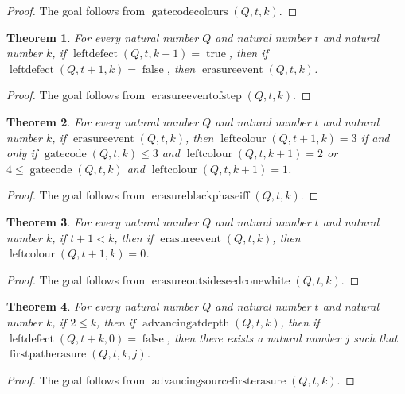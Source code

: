 \documentclass[11pt]{article}
\newtheorem{theorem}{Theorem}[section]
\theoremstyle{definition}
\begin{document}
\begin{proof}
The goal follows from \(\operatorname{gatecodecolours}(Q, t, k)\).
\end{proof}
\begin{theorem}
\label{ll:observations:erasure-event-of-step}
For every natural number \(Q\) and natural number \(t\) and natural number \(k\), if \(\operatorname{leftdefect}(Q, t, k + 1) = \operatorname{true}\), then if \(\operatorname{leftdefect}(Q, t + 1, k) = \operatorname{false}\), then \(\operatorname{erasureevent}(Q, t, k)\).
\end{theorem}
\begin{proof}
The goal follows from \(\operatorname{erasureeventofstep}(Q, t, k)\).
\end{proof}
\begin{theorem}
\label{ll:observations:erasure-black-phase-iff}
For every natural number \(Q\) and natural number \(t\) and natural number \(k\), if \(\operatorname{erasureevent}(Q, t, k)\), then \(\operatorname{leftcolour}(Q, t + 1, k) = 3\) if and only if \(\operatorname{gatecode}(Q, t, k) \le 3\) and \(\operatorname{leftcolour}(Q, t, k + 1) = 2\) or \(4 \le \operatorname{gatecode}(Q, t, k)\) and \(\operatorname{leftcolour}(Q, t, k + 1) = 1\).
\end{theorem}
\begin{proof}
The goal follows from \(\operatorname{erasureblackphaseiff}(Q, t, k)\).
\end{proof}
\begin{theorem}
\label{ll:observations:erasure-outside-seed-cone-white}
For every natural number \(Q\) and natural number \(t\) and natural number \(k\), if \(t + 1 < k\), then if \(\operatorname{erasureevent}(Q, t, k)\), then \(\operatorname{leftcolour}(Q, t + 1, k) = 0\).
\end{theorem}
\begin{proof}
The goal follows from \(\operatorname{erasureoutsideseedconewhite}(Q, t, k)\).
\end{proof}
\begin{theorem}
\label{ll:observations:advancing-source-first-erasure}
For every natural number \(Q\) and natural number \(t\) and natural number \(k\), if \(2 \le k\), then if \(\operatorname{advancingatdepth}(Q, t, k)\), then if \(\operatorname{leftdefect}(Q, t + k, 0) = \operatorname{false}\), then there exists a natural number \(j\) such that \(\operatorname{firstpatherasure}(Q, t, k, j)\).
\end{theorem}
\begin{proof}
The goal follows from \(\operatorname{advancingsourcefirsterasure}(Q, t, k)\).
\end{proof}
\end{document}
